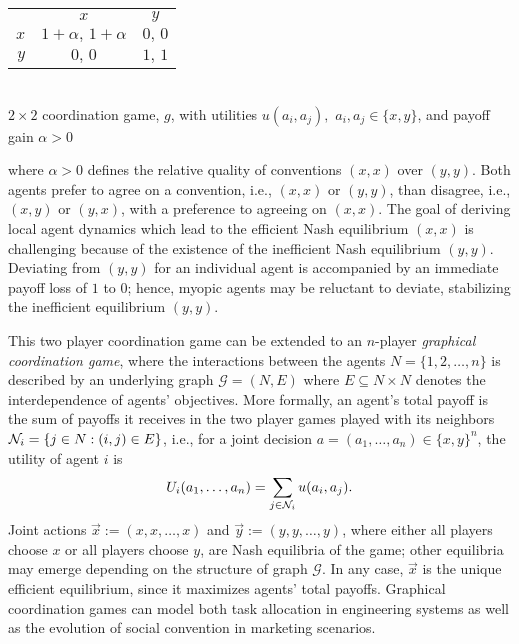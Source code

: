 \begin{center}
\begin{tabular}{r|c|c|}
\multicolumn{1}{r}{}	&\multicolumn{1}{c}{$x$}	&\multicolumn{1}{c}{$y$}\\
\cline{2-3}$x$			&$1+\alpha,\,1+\alpha$	&$0,\,0$\\
\cline{2-3}$y$			&$0,\,0$				&$1,\,1$\\
\cline{2-3}
\end{tabular}\\
\medskip
$2\times 2$ coordination game, $g$, with utilities $u(a_i,a_j),$ $a_i,a_j\in\{x,y\}$, and payoff gain $\alpha>0$
\end{center}
where $\alpha > 0$ defines the relative quality of conventions $(x,x)$ over $(y,y)$.  Both agents prefer to agree on a convention, i.e., $(x,x)$ or $(y,y)$, than disagree, i.e., $(x,y)$ or $(y,x)$, with a preference to agreeing on $(x,x)$.  
The goal of deriving local agent dynamics which lead to the efficient Nash equilibrium $(x,x)$ is challenging because of the existence of the inefficient Nash equilibrium $(y,y)$.  Deviating from $(y,y)$ for an individual agent is accompanied by an immediate payoff loss of $1$ to $0$; hence, myopic agents may be reluctant to deviate, stabilizing the inefficient equilibrium $(y,y)$.

This two player coordination game can be extended to an $n$-player \emph{graphical coordination game}\cite{Kearns2001,Young2011, Montanari2010}, where the interactions between the agents $N=\{1, 2, \dots, n\}$ is described by an underlying graph $\mathcal{G} = (N,E)$ where $E \subseteq N\times N$ denotes the interdependence of agents' objectives.  More formally, an agent's total payoff is the sum of payoffs it receives in the two player games played with its neighbors ${\cal N}_i = \{j \in N : (i,j) \in E\}$, i.e., for a joint decision $a = (a_1, \dots, a_n) \in \{x,y\}^n$, the utility of agent $i$ is
%
\begin{equation}\label{e:original utility}
%
U_i(a_1, \dots, a_n) = \sum_{j \in {\cal N}_i} u(a_i, a_j).
%
\end{equation}
%
Joint actions $\vec{x}:=(x,x,\ldots,x)$ and $\vec{y}:=(y,y,\ldots,y)$, where either all players choose $x$ or all players choose $y$, are Nash equilibria of the game; other equilibria may emerge depending on the structure of graph $\mathcal{G}.$ In any case, $\vec{x}$ is the unique efficient equilibrium, since it maximizes agents' total payoffs.  Graphical coordination games can model both task allocation in engineering systems  as well as the evolution of social convention in marketing scenarios. 
 
